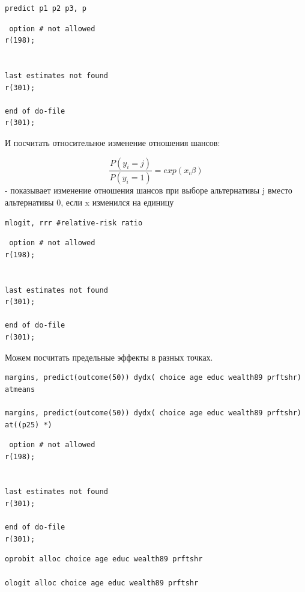 \documentclass[]{book}
\begin{document}
\begin{verbatim}
predict p1 p2 p3, p
\end{verbatim}

\begin{verbatim}
 option # not allowed
r(198);


last estimates not found
r(301);

end of do-file
r(301);
\end{verbatim}

И посчитать относительное изменение отношения шансов:

\[
\frac{P(y_{i} = j)}{P(y_{i} = 1)} = exp(x_{i}\beta)
\] - показывает изменение отношения шансов при выборе альтернативы j вместо альтернативы 0, если x изменился на единицу

\begin{verbatim}
mlogit, rrr #relative-risk ratio
\end{verbatim}

\begin{verbatim}
 option # not allowed
r(198);


last estimates not found
r(301);

end of do-file
r(301);
\end{verbatim}

Можем посчитать предельные эффекты в разных точках.

\begin{verbatim}
margins, predict(outcome(50)) dydx( choice age educ wealth89 prftshr) atmeans 

margins, predict(outcome(50)) dydx( choice age educ wealth89 prftshr) at((p25) *)
\end{verbatim}

\begin{verbatim}
 option # not allowed
r(198);


last estimates not found
r(301);

end of do-file
r(301);
\end{verbatim}

\begin{verbatim}
oprobit alloc choice age educ wealth89 prftshr

ologit alloc choice age educ wealth89 prftshr
\end{verbatim}
\end{document}

